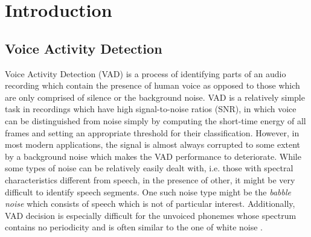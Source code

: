 
\chapter{Introduction} %

\label{Chapter1} %



\section{Voice Activity Detection}

Voice Activity Detection (VAD) is a process of identifying parts of an audio recording which contain the presence of human voice as opposed to those which are only comprised of silence or the background noise. VAD is a relatively simple task in recordings which have high signal-to-noise ratios (SNR), in which voice can be distinguished from noise simply by computing the short-time energy of all frames and setting an appropriate threshold for their classification. However, in most modern applications, the signal is almost always corrupted to some extent by a background noise which makes the VAD performance to deteriorate. While some types of noise can be relatively easily dealt with, i.e. those with spectral characteristics different from speech, in the presence of other, it might be very difficult to identify speech segments. One such noise type might be the \emph{babble noise} which consists of speech which is not of particular interest. Additionally, VAD decision is especially difficult for the unvoiced phonemes whose spectrum contains no periodicity and is often similar to the one of white noise \cite{Kondoz, Michaelis}.

